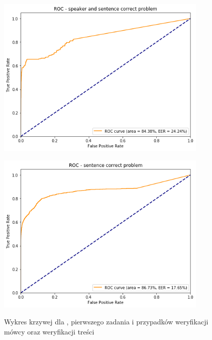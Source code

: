 \begin{figure}[H]
    \centering
    \begin{minipage}{.5\textwidth}
        \centering
        \includegraphics[width=0.9\textwidth]{images/4_3_dnn_roc_speaker}
        \label{fig:4_3_dnn_roc_speaker}
    \end{minipage}%
    \begin{minipage}{.5\textwidth}
        \centering
        \includegraphics[width=0.9\textwidth]{images/4_3_dnn_roc_sentence}
        \label{fig:4_3_dnn_roc_sentence}
    \end{minipage}%
    \caption{Wykres krzywej  dla , pierwszego zadania  i przypadków weryfikacji mówcy oraz weryfikacji treści}
\end{figure}

